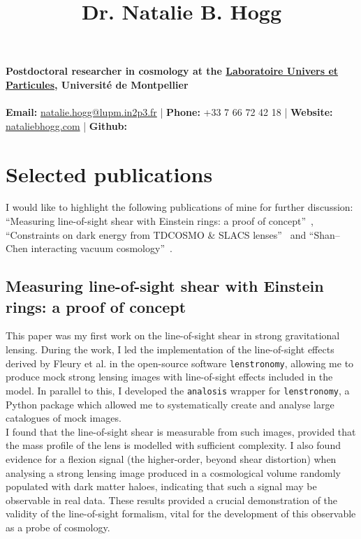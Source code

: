 \documentclass[11pt]{article}
\begin{document}
	
	\title{Dr. Natalie B. Hogg} %
	
	\textbf{Postdoctoral researcher in cosmology at the \href{https://www.lupm.in2p3.fr/}{Laboratoire Univers et Particules}, Universit\'e de Montpellier}\\ \\
	\textbf{Email:} \href{mailto:natalie.hogg@lupm.in2p3.fr}{natalie.hogg@lupm.in2p3.fr} | \textbf{Phone:} +33 7 66 72 42 18 | \textbf{Website:} \href{nataliebhogg.com}{nataliebhogg.com} | \textbf{Github:} \href{https://github.com/nataliehogg}{\faGithub}

    \section{Selected publications}
    
    I would like to highlight the following publications of mine for further discussion: ``Measuring line-of-sight shear with Einstein rings: a proof of concept''~\cite{Hogg:2022ycw}, ``Constraints on dark energy from TDCOSMO \& SLACS lenses''~\cite{Hogg:2023khs} and  ``Shan--Chen interacting vacuum cosmology''~\cite{Hogg:2021yiz}.
    
    \subsection{Measuring line-of-sight shear with Einstein rings: a proof of concept}
    This paper was my first work on the line-of-sight shear in strong gravitational lensing. During the work, I led the implementation of the line-of-sight effects derived by Fleury et al. \cite{Fleury:2021tke} in the open-source software \texttt{lenstronomy}, allowing me to produce mock strong lensing images with line-of-sight effects included in the model. In parallel to this, I developed the \texttt{analosis} wrapper for \texttt{lenstronomy}, a Python package which allowed me to systematically create and analyse large catalogues of mock images. \\
    
    I found that the line-of-sight shear is measurable from such images, provided that the mass profile of the lens is modelled with sufficient complexity. I also found evidence for a flexion signal (the higher-order, beyond shear distortion) when analysing a strong lensing image produced in a cosmological volume randomly populated with dark matter haloes, indicating that such a signal may be observable in real data. These results provided a crucial demonstration of the validity of the line-of-sight formalism, vital for the development of this observable as a probe of cosmology.
    
\end{document}
